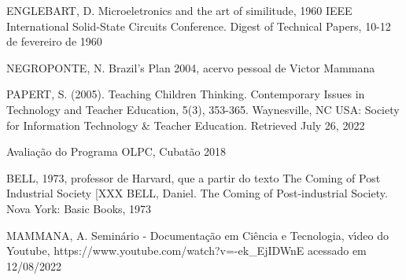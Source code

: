 \documentclass[
12pt,		%
openright,	%
twoside,  %
a4paper,			%
chapter=TITLE,		%
english,			%
french,				%
spanish,			%
brazil				%
]{USPSC-classe/USPSC}
\begin{document}
\begin{flushleft}
\begin{flushleft}
[ENGLEBART, 2017] ENGLEBART, D. Microeletronics and the art of similitude, 1960 IEEE International Solid-State Circuits Conference. Digest of Technical Papers, 10-12 de fevereiro de 1960
\end{flushleft}


\end{flushleft}


\begin{flushleft}
\begin{flushleft}
[NEGROPONTE, 2004] NEGROPONTE, N. Brazil's Plan 2004, acervo pessoal de Victor Mammana
\end{flushleft}


\end{flushleft}


\begin{flushleft}
\begin{flushleft}
[PAPERT, 2005] PAPERT, S. (2005). Teaching Children Thinking. Contemporary Issues in Technology and Teacher Education, 5(3), 353-365. Waynesville, NC USA: Society for Information Technology \& Teacher Education. Retrieved July 26, 2022
\end{flushleft}


\end{flushleft}


\begin{flushleft}
\begin{flushleft}
 Avalia\c{c}\~ao do Programa OLPC, Cubat\~ao 2018
\end{flushleft}


\end{flushleft}


\begin{flushleft}
\begin{flushleft}
[BELL, 1973]  BELL, 1973, professor de Harvard, que a partir do texto The Coming of Post Industrial Society [XXX BELL, Daniel. The Coming of Post-industrial Society. Nova York: Basic Books, 1973
\end{flushleft}


\end{flushleft}


\begin{flushleft}
\begin{flushleft}
[MAMMANA, 2020] MAMMANA, A. Semin\'ario - Documenta\c{c}\~ao em Ci\^encia e Tecnologia, v\'{\i}deo do Youtube, https://www.youtube.com/watch?v=-ek\_EjIDWnE acessado em 12/08/2022
\end{flushleft}


\end{flushleft}
\end{document}
